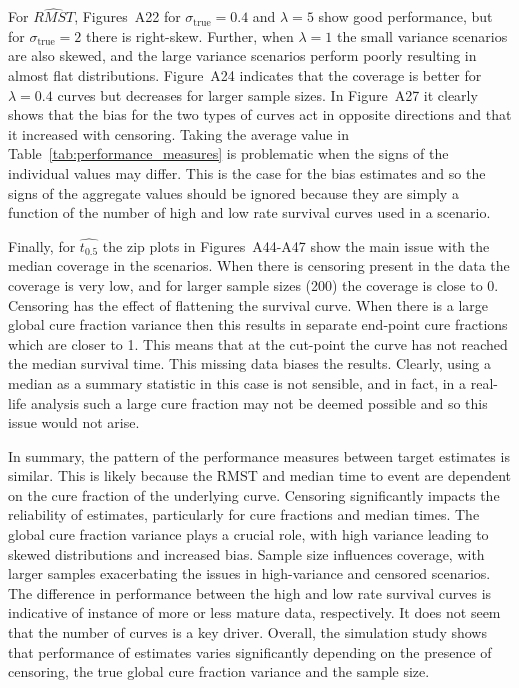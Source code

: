 \documentclass[AMA,STIX1COL]{WileyNJD-v2}
\begin{document}
For $\widehat{RMST}$, Figures~A22 for $\sigma_{\text{true}} = 0.4$ and $\lambda = 5$ show good performance, but for $\sigma_{\text{true}} = 2$ there is right-skew. Further, when $\lambda = 1$ the small variance scenarios are also skewed, and the large variance scenarios perform poorly resulting in almost flat distributions. Figure~A24 indicates that the coverage is better for $\lambda = 0.4$ curves but decreases for larger sample sizes. In Figure~A27 it clearly shows that the bias for the two types of curves act in opposite directions and that it increased with censoring. Taking the average value in Table~\ref{tab:performance_measures} is problematic when the signs of the individual values may differ. This is the case for the bias estimates and so the signs of the aggregate values should be ignored because they are simply a function of the number of high and low rate survival curves used in a scenario.

Finally, for $\widehat{t_{0.5}}$ the zip plots in Figures~A44-A47 show the main issue with the median coverage in the scenarios. When there is censoring present in the data the coverage is very low, and for larger sample sizes (200) the coverage is close to 0. Censoring has the effect of flattening the survival curve. When there is a large global cure fraction variance then this results in separate end-point cure fractions which are closer to 1. This means that at the cut-point the curve has not reached the median survival time. This missing data biases the results. Clearly, using a median as a summary statistic in this case is not sensible, and in fact, in a real-life analysis such a large cure fraction may not be deemed possible and so this issue would not arise.  

In summary, the pattern of the performance measures between target estimates is similar. This is likely because the RMST and median time to event are dependent on the cure fraction of the underlying curve. Censoring significantly impacts the reliability of estimates, particularly for cure fractions and median times. The global cure fraction variance plays a crucial role, with high variance leading to skewed distributions and increased bias. Sample size influences coverage, with larger samples exacerbating the issues in high-variance and censored scenarios. The difference in performance between the high and low rate survival curves is indicative of instance of more or less mature data, respectively. It does not seem that the number of curves is a key driver. Overall, the simulation study shows that performance of estimates varies significantly depending on the presence of censoring, the true global cure fraction variance and the sample size.
\end{document}
